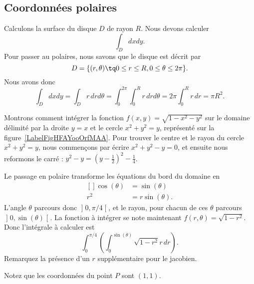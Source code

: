 \subsection{Coordonnées polaires}

\begin{example}
	Calculons la surface du disque \( D\) de rayon \( R\). Nous devons calculer
	\begin{equation}
		\int_Ddxdy.
	\end{equation}
	Pour passer au polaires, nous savons que le disque est décrit par
	\begin{equation}
		D=\{ (r,\theta)\tq 0\leq r\leq R,0\leq\theta\leq 2\pi \}.
	\end{equation}
	Nous avons donc
	\begin{equation}
		\int_Ddxdy=\int_{D}r\,drd\theta=\int_0^{2\pi}\int_0^Rr\,drd\theta=2\pi\int_0^Rr\,dr=\pi R^2.
	\end{equation}
\end{example}

\begin{example}     \label{ExpmfDtAtV}
	Montrons comment intégrer la fonction \( f(x,y)=\sqrt{1-x^2-y^2}\) sur le domaine délimité par la droite \( y=x\) et le cercle \( x^2+y^2=y\), représenté sur la figure~\ref{LabelFigHFAYooOrfMAA}. Pour trouver le centre et le rayon du cercle \( x^2+y^2=y\), nous commençons par écrire \( x^2+y^2-y=0\), et ensuite nous reformons le carré : \( y^2-y=(y-\frac{ 1 }{2})^2-\frac{1}{ 4 }\).

	\newcommand{\CaptionFigHFAYooOrfMAA}{Passage en polaire pour intégrer sur un morceau de cercle.}
	

	Le passage en polaire transforme les équations du bord du domaine en
	\begin{equation}
		\begin{aligned}[]
			\cos(\theta) & =\sin(\theta)   \\
			r^2          & =r\sin(\theta).
		\end{aligned}
	\end{equation}
	L'angle \( \theta\) parcours donc \( \mathopen] 0 , \pi/4 \mathclose[\), et le rayon, pour chacun de ces \( \theta\) parcours \( \mathopen] 0 , \sin(\theta) \mathclose[\). La fonction à intégrer se note maintenant \( f(r,\theta)=\sqrt{1-r^2}\). Donc l'intégrale à calculer est
	\begin{equation}		\label{PgOMRapIntMultFubiniBoutCercle}
		\int_{0}^{\pi/4}\left( \int_0^{\sin(\theta)}\sqrt{1-r^2}r\,dr \right).
	\end{equation}
	Remarquez la présence d'un \( r\) supplémentaire pour le jacobien.

	Notez que les coordonnées du point \( P\) sont \( (1,1)\).
\end{example}

